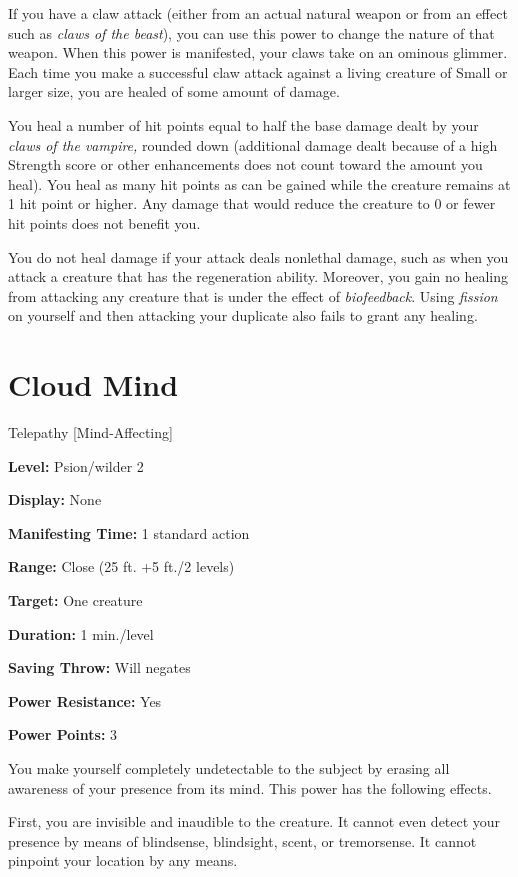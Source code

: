 \documentclass{article}
\begin{document}
If you have a claw attack (either from an actual natural weapon or from an effect 
such as \textit{claws of the beast}), you can use this power to change the nature 
of that weapon. When this power is manifested, your claws take on an ominous glimmer. 
Each time you make a successful claw attack against a living creature of Small 
or larger size, you are healed of some amount of damage.

You heal a number of hit points equal to half the base damage dealt by your \textit{claws 
of the vampire, }rounded down (additional damage dealt because of a high Strength 
score or other enhancements does not count toward the amount you heal). You heal 
as many hit points as can be gained while the creature remains at 1 hit point or 
higher. Any damage that would reduce the creature to 0 or fewer hit points does 
not benefit you.

You do not heal damage if your attack deals nonlethal damage, such as when you 
attack a creature that has the regeneration ability. Moreover, you gain no healing 
from attacking any creature that is under the effect of \textit{biofeedback}. Using 
\textit{fission }on yourself and then attacking your duplicate also fails to grant 
any healing.

\vspace{12pt}
\section*{Cloud Mind}

Telepathy [Mind-Affecting]

\textbf{Level:} Psion/wilder 2

\textbf{Display:} None

\textbf{Manifesting Time:} 1 standard action

\textbf{Range:} Close (25 ft. +5 ft./2 levels)

\textbf{Target:} One creature

\textbf{Duration:} 1 min./level

\textbf{Saving Throw:} Will negates

\textbf{Power Resistance:} Yes

\textbf{Power Points:} 3

You make yourself completely undetectable to the subject by erasing all awareness 
of your presence from its mind. This power has the following effects.

First, you are invisible and inaudible to the creature. It cannot even detect your 
presence by means of blindsense, blindsight, scent, or tremorsense. It cannot pinpoint 
your location by any means.
\end{document}
